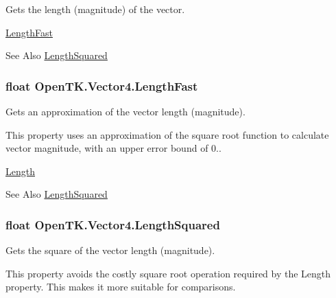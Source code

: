 Gets the length (magnitude) of the vector. 

\hyperlink{struct_open_t_k_1_1_vector4_a3bebfd9daf625e3da63f9a734544e0c9}{Length\-Fast} \begin{DoxySeeAlso}{See Also}
\hyperlink{struct_open_t_k_1_1_vector4_ab66b8b2f18337d5d5a758f3c76a1fd60}{Length\-Squared}


\end{DoxySeeAlso}
\hypertarget{struct_open_t_k_1_1_vector4_a3bebfd9daf625e3da63f9a734544e0c9}{
\subsubsection[{Length\-Fast}]{\setlength{\rightskip}{0pt plus 5cm}float Open\-T\-K.\-Vector4.\-Length\-Fast\hspace{0.3cm}{\ttfamily [get]}}}\label{struct_open_t_k_1_1_vector4_a3bebfd9daf625e3da63f9a734544e0c9}


Gets an approximation of the vector length (magnitude). 

This property uses an approximation of the square root function to calculate vector magnitude, with an upper error bound of 0.. 

\hyperlink{struct_open_t_k_1_1_vector4_a5ebc615641557a752cfe160608f09832}{Length} \begin{DoxySeeAlso}{See Also}
\hyperlink{struct_open_t_k_1_1_vector4_ab66b8b2f18337d5d5a758f3c76a1fd60}{Length\-Squared}


\end{DoxySeeAlso}
\hypertarget{struct_open_t_k_1_1_vector4_ab66b8b2f18337d5d5a758f3c76a1fd60}{
\subsubsection[{Length\-Squared}]{\setlength{\rightskip}{0pt plus 5cm}float Open\-T\-K.\-Vector4.\-Length\-Squared\hspace{0.3cm}{\ttfamily [get]}}}\label{struct_open_t_k_1_1_vector4_ab66b8b2f18337d5d5a758f3c76a1fd60}


Gets the square of the vector length (magnitude). 

This property avoids the costly square root operation required by the Length property. This makes it more suitable for comparisons. 

